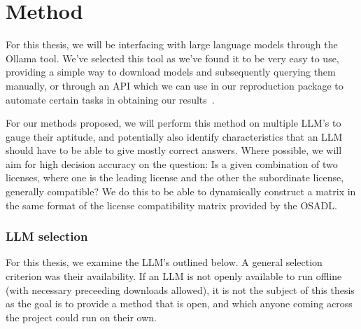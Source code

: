 
\chapter{Method}\label{ch:method}


For this thesis, we will be interfacing with large language models through the Ollama tool. We've selected this tool as we've found it to be very easy to use, providing a simple way to download models and subsequently querying them manually, or through an API which we can use in our reproduction package to automate certain tasks in obtaining our results~\cite{ollama_docs}.

For our methods proposed, we will perform this method on multiple LLM's to gauge their aptitude, and potentially also identify characteristics that an LLM should have to be able to give mostly correct answers. Where possible, we will aim for high decision accuracy on the question: Is a given combination of two licenses, where one is the leading license and the other the subordinate license, generally compatible? We do this to be able to dynamically construct a matrix in the same format of the license compatibility matrix provided by the OSADL.

\subsection{LLM selection}

For this thesis, we examine the LLM's outlined below. A general selection criterion was their availability. If an LLM is not openly available to run offline (with necessary preceeding downloads allowed), it is not the subject of this thesis as the goal is to provide a method that is open, and which anyone coming across the project could run on their own.

